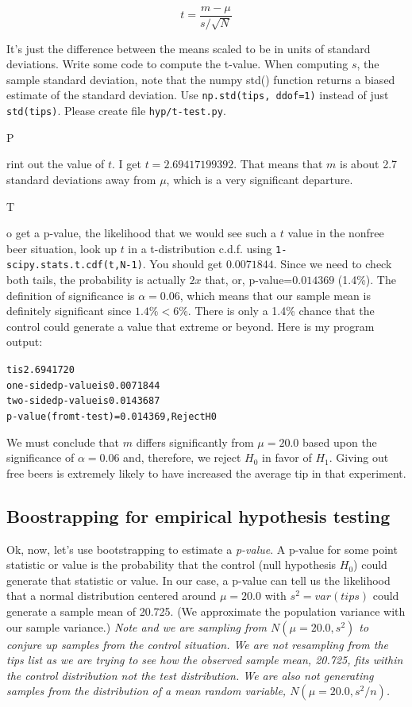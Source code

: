 \documentclass[titlepage]{tufte-book}
\newcounter{problem}
\newcommand{\step}[1]{{}
\vspace{4pt} \noindent {\bf \theproblem. }#1\addtocounter{problem}{1}}
\begin{document}
\begin{fullwidth}
\[\tag{t-value}
t = \frac{m - \mu}{s / \sqrt{N}}
\]

\noindent It's just the difference between the means scaled to be in units of standard deviations.  Write some code to compute the t-value. When computing $s$, the sample standard deviation, note that the numpy std() function returns a biased estimate of the standard deviation. Use {\tt np.std(tips, ddof=1)} instead of just {\tt std(tips)}.  Please create file {\tt hyp/t-test.py}.

\step Print out the value of $t$.  I get $t = 2.69417199392$. That means that $m$ is about 2.7 standard deviations away from $\mu$, which is a very significant departure. 

\step  To get a p-value, the likelihood that we would see such a $t$ value in the nonfree beer situation, look up $t$ in a t-distribution c.d.f. using {\tt 1-scipy.stats.t.cdf(t,N-1)}. You should get $0.0071844$. Since we need to check both tails, the probability is actually $2x$ that, or, p-value=$0.014369$ (1.4\%). The definition of significance is $\alpha = 0.06$, which means that our sample mean is definitely significant since $1.4\% < 6\%$.  There is only a 1.4\% chance that the control could generate a value that extreme or beyond. Here is my program output:

\begin{alltt}
t is 2.6941720
one-sided p-value is 0.0071844
two-sided p-value is 0.0143687
p-value (from t-test) = 0.014369, Reject H0
\end{alltt}

We must conclude that $m$ differs significantly from $\mu = 20.0$ based upon the significance of $\alpha=0.06$ and, therefore, we reject $H_0$ in favor of $H_1$.  Giving out free beers is extremely likely to have increased the average tip in that experiment.

\subsection{Boostrapping for empirical hypothesis testing}

\setcounter{problem}{1}

Ok, now, let's use bootstrapping to estimate a {\em p-value}. A p-value for some point statistic or value is the probability that the control (null hypothesis $H_0$) could generate that statistic or value. In our case, a p-value can tell us the likelihood that a normal distribution centered around $\mu=20.0$ with $s^2=var(tips)$ could generate a sample mean of 20.725. (We approximate the population variance with our sample variance.) {\em Note and we are sampling from $N(\mu=20.0,s^2)$ to conjure up samples from the control situation. We are not resampling from the tips list as we are trying to see how the observed sample mean, 20.725, fits within the control distribution not the test distribution. We are also not generating samples from the distribution of a mean random variable, $N(\mu=20.0,s^2/n)$.}  


\end{fullwidth}
\end{document}
